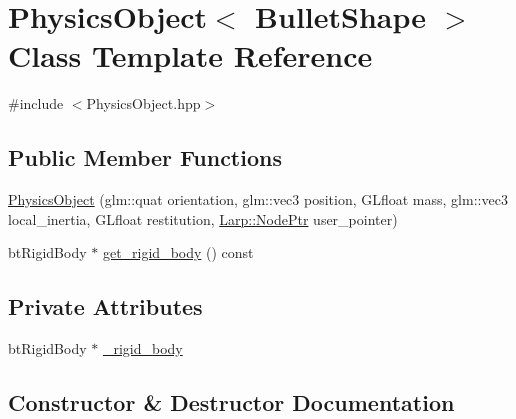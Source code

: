 \hypertarget{classPhysicsObject}{}\section{Physics\+Object$<$ Bullet\+Shape $>$ Class Template Reference}
\label{classPhysicsObject}


{\ttfamily \#include $<$Physics\+Object.\+hpp$>$}

\subsection*{Public Member Functions}
\begin{DoxyCompactItemize}
\item 
\hyperlink{classPhysicsObject_a86d790a753fc35fbbffc79175af768da}{Physics\+Object} (glm\+::quat orientation, glm\+::vec3 position, G\+Lfloat mass, glm\+::vec3 local\+\_\+inertia, G\+Lfloat restitution, \hyperlink{namespaceLarp_a171c1dc8b70cfb441b15d7386780db23}{Larp\+::\+Node\+Ptr} user\+\_\+pointer)
\item 
bt\+Rigid\+Body $\ast$ \hyperlink{classPhysicsObject_aef58ae7045f02ec5a437f7277ec70c8b}{get\+\_\+rigid\+\_\+body} () const 
\end{DoxyCompactItemize}
\subsection*{Private Attributes}
\begin{DoxyCompactItemize}
\item 
bt\+Rigid\+Body $\ast$ \hyperlink{classPhysicsObject_a5933d74bff03086c164d94c55cb63352}{\+\_\+rigid\+\_\+body}
\end{DoxyCompactItemize}


\subsection{Constructor \& Destructor Documentation}
